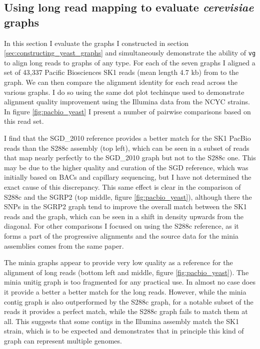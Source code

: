 \subsection{Using long read mapping to evaluate \emph{cerevisiae} graphs} %
\label{sec:yeast_long_read}

In this section I evaluate the graphs I constructed in section \ref{sec:constructing_yeast_graphs} and simultaneously demonstrate the ability of {\tt vg} to align long reads to graphs of any type.
For each of the seven graphs I aligned a set of 43,337 Pacific Biosciences SK1 reads (mean length 4.7 kb) from \cite{yue2017contrasting} to the graph.
We can then compare the alignment identity for each read across the various graphs.
I do so using the same dot plot techinque used to demonstrate alignment quality improvement using the Illumina data from the NCYC strains.
In figure \ref{fig:pacbio_yeast} I present a number of pairwise comparisons based on this read set.

I find that the SGD\_2010 reference provides a better match for the SK1 PacBio reads than the S288c assembly (top left), which can be seen in a subset of reads that map nearly perfectly to the SGD\_2010 graph but not to the S288c one.
This may be due to the higher quality and curation of the SGD reference, which was initially based on BACs and capillary sequencing, but I have not determined the exact cause of this discrepancy.
This same effect is clear in the comparison of S288c and the SGRP2 (top middle, figure \ref{fig:pacbio_yeast}), although there the SNPs in the SGRP2 graph tend to improve the overall match between the SK1 reads and the graph, which can be seen in a shift in density upwards from the diagonal.
For other comparisons I focused on using the S288c reference, as it forms a part of the progressive alignments and the source data for the minia assemblies comes from the same paper.

The minia graphs appear to provide very low quality as a reference for the alignment of long reads (bottom left and middle, figure \ref{fig:pacbio_yeast}).
The minia unitig graph is too fragmented for any practical use.
In almost no case does it provide a better a better match for the long reads.
However, while the minia contig graph is also outperformed by the S288c graph, for a notable subset of the reads it provides a perfect match, while the S288c graph fails to match them at all.
This suggests that some contigs in the Illumina assembly match the SK1 strain, which is to be expected and demonstrates that in principle this kind of graph can represent multiple genomes.

